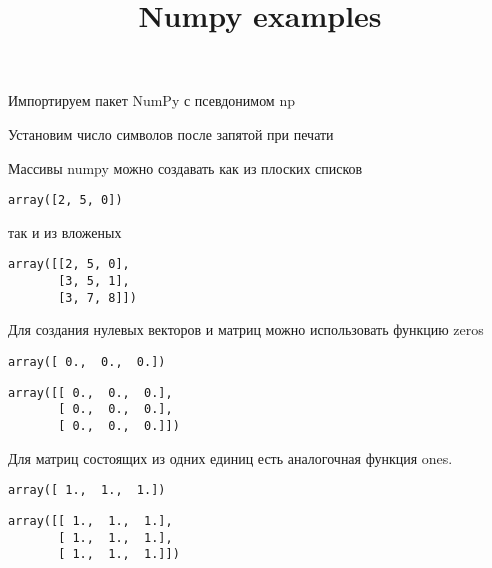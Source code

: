\documentclass{article}
\title{Numpy examples}
\begin{document}
    
    
    \maketitle
    
    

    
    Импортируем пакет NumPy с псевдонимом np

    Установим число символов после запятой при печати

    Массивы numpy можно создавать как из плоских списков

    
    
    \begin{verbatim}
array([2, 5, 0])
    \end{verbatim}

    

    так и из вложеных

    
    
    \begin{verbatim}
array([[2, 5, 0],
       [3, 5, 1],
       [3, 7, 8]])
    \end{verbatim}

    

    Для создания нулевых векторов и матриц можно использовать функцию zeros

    
    
    \begin{verbatim}
array([ 0.,  0.,  0.])
    \end{verbatim}

    

    
    
    \begin{verbatim}
array([[ 0.,  0.,  0.],
       [ 0.,  0.,  0.],
       [ 0.,  0.,  0.]])
    \end{verbatim}

    

    Для матриц состоящих из одних единиц есть аналогочная функция ones.

    
    
    \begin{verbatim}
array([ 1.,  1.,  1.])
    \end{verbatim}

    

    
    
    \begin{verbatim}
array([[ 1.,  1.,  1.],
       [ 1.,  1.,  1.],
       [ 1.,  1.,  1.]])
    \end{verbatim}
\end{document}
